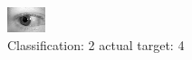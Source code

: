\begin{figure}[h!]
\begin{center}
\includegraphics[width=0.60\columnwidth]{figures/ID825_class_2_target_4.png}
\end{center}
\caption{ Classification: 2 actual target: 4}
\label{fig:ID825_class_2_target_4}
\end{figure}
